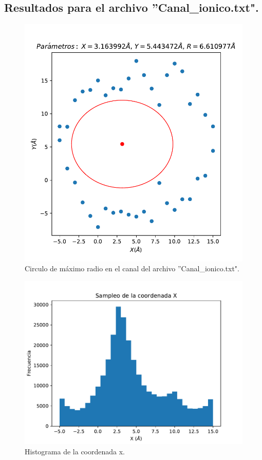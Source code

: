\documentclass[12pt,letterpaper]{article}
\begin{document}
\subsection{Resultados para el archivo ''Canal\_ionico.txt". }
\begin{figure}[H]
\includegraphics{canal.pdf}
\caption{Circulo de máximo radio en el canal del archivo ''Canal\_ionico.txt".}
\centering
\end{figure}

\begin{figure}[H]
\includegraphics{x_hist.pdf}
\caption{Histograma de la coordenada x.}
\centering
\end{figure}
\end{document}
